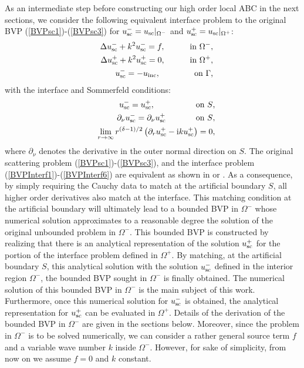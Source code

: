 \documentclass[final,3p,times,12pt]{elsarticle}
\newcommand{\usc}{u_{\rm sc}}
\newcommand{\uinc}{u_{\rm inc}}
\begin{document}
As an intermediate step before constructing our high order local ABC in the next sections, we consider the following equivalent interface problem to the original BVP (\ref{BVPsc1})-(\ref{BVPsc3}) for  $\usc^{-} = \usc |_{\Omega^{-}}$ and $\usc^{+} = \usc |_{\Omega^{+}}$:
\begin{eqnarray}
&& \Delta \usc^{-} + k^2 \usc^{-} = f, \quad\qquad  \text{in $\Omega^{-}$}, \label{BVPInterf1} \\
&& \Delta \usc^{+} + k^2 \usc^{+} = 0, \quad\qquad  \text{in $\Omega^{+}$}, \label{BVPInterf2} \\
&& \usc^{-} = - \uinc, \qquad\qquad\,  \text{on $\Gamma$,} \label{BVPInterf3}
\end{eqnarray}
\noindent with the interface and Sommerfeld conditions:
\begin{eqnarray}
&& \usc^{-} = \usc^{+}, \qquad\qquad\quad  \text{on $S$,}\label{BVPInterf4}  \\
&&\partial_{\nu} \usc^{-} = \partial_{\nu} \usc^{+}  \quad\qquad\,\,\,\,\text{on $S$}, \label{BVPInterf5} \\
&& \lim_{r \rightarrow \infty} r^{(\delta-1)/2}\left( \partial_{r} \usc^{+} - \mathrm{i} k \usc^{+} \right) = 0,  \label{BVPInterf6}
\end{eqnarray}
where $\partial_{\nu}$ denotes the derivative in the outer normal direction on $S$. The original scattering problem (\ref{BVPsc1})-(\ref{BVPsc3}), and the interface problem (\ref{BVPInterf1})-(\ref{BVPInterf6}) are equivalent as shown in \cite[Thm 1]{JCP2010} or \cite[Lemma 4.19]{McLean2000}. 
As a consequence, by simply requiring the Cauchy data to match at the artificial boundary $S$, all higher order derivatives also match at the interface.  {This matching condition at the artificial boundary will ultimately lead to a bounded BVP in $\Omega^{-}$ whose numerical solution approximates to a reasonable degree the solution of the original unbounded problem in $\Omega^{-}$. This bounded BVP is constructed by realizing that there is an analytical representation of the solution $\usc^{+}$ for the portion of the interface problem defined in $\Omega^{+}$. By matching, at the artificial boundary $S$, this analytical solution with the solution $\usc^{-}$ defined in the interior region $\Omega^{-}$, the bounded BVP sought in $\Omega^{-}$ is finally obtained. The numerical solution of this bounded BVP in $\Omega^{-}$ is the main subject of this work. Furthermore, once this numerical solution for $\usc^{-}$ is obtained, the analytical representation for $\usc^{+}$ can be evaluated in $\Omega^{+}$. Details of the derivation of the bounded BVP in $\Omega^{-}$ are given in the sections below.  Moreover, since the problem in $\Omega^{-}$ is to be solved numerically, we can consider a rather general source term $f$ and a variable wave number $k$ inside $\Omega^{-}$. However, for sake of simplicity, from now on we assume $f=0$ and $k$ constant.}
\end{document}
